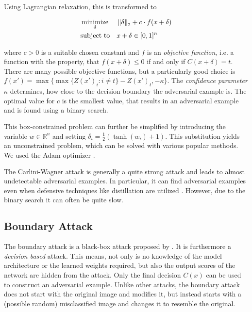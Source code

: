Using Lagrangian relaxation, this is transformed to

\begin{equation}
\begin{aligned}
& \operatorname*{minimize}_{\delta} && \left \lVert \delta \right \rVert _2 + c \cdot f(x + \delta)\\
& \text{subject to} && x + \delta \in [0,1]^n
\end{aligned}
\end{equation}

where $c > 0$ is a suitable chosen constant and $f$ is an \emph{objective function}, i.e. a function with the property, that
$f(x + \delta) \leq 0$ if and only if $C(x + \delta) = t$.
There are many possible objective functions, but a particularly good choice is
$f(x') = \max \{ \max \{Z(x')_i : i \neq t \} - Z(x')_t, -\kappa \}$.
The \emph{confidence parameter} $\kappa$ determines, how close to the decision boundary the adversarial example is.
The optimal value for $c$ is the smallest value, that results in an adversarial example and is found using a binary search.

This box-constrained problem can further be simplified by introducing the variable $w \in \mathbb{R}^n$ and setting $\delta_i = \frac{1}{2} (\tanh(w_i) + 1)$.
This substitution yields an unconstrained problem, which can be solved with various popular methods. We used the Adam optimizer \citep{adam}.

The Carlini-Wagner attack is generally a quite strong attack and leads to almost undetectable adversarial examples.
In particular, it can find adversarial examples even when defensive techniques like distillation are utilized \citep{carlini}.
However, due to the binary search it can often be quite slow.

\subsection{Boundary Attack}

The boundary attack is a black-box attack proposed by \citet{boundary}. It is furthermore a \emph{decision based} attack. This means, not only is no knowledge of the model architecture or the learned weights required, but also the output scores of the network are hidden from the attack. Only the final decision $C(x)$ can be used to construct an adversarial example.
Unlike other attacks, the boundary attack does not start with the original image and modifies it, but instead starts with a (possible random) misclassified image and changes it to resemble the original.

